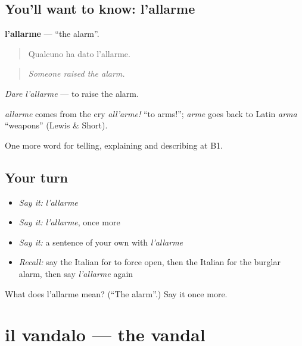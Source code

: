 \subsection*{You'll want to know: l'allarme}
\textbf{l'allarme} — \textquotedblleft{}the alarm\textquotedblright{}.

\begin{quote}
Qualcuno ha dato l'allarme.
\end{quote}

\begin{quote}
\emph{Someone raised the alarm.}
\end{quote}

\emph{Dare l'allarme} — to raise the alarm.

\begin{cousinweb}
\emph{allarme} comes from the cry \emph{all'arme!} \textquotedblleft{}to arms!\textquotedblright{}; \emph{arme} goes back to Latin \emph{arma} \textquotedblleft{}weapons\textquotedblright{} (Lewis \& Short).
\end{cousinweb}

\begin{grammarlens}[title={What you've built}]
One more word for telling, explaining and describing at B1.
\end{grammarlens}

\subsection*{Your turn}
\begin{itemize}
\raggedright
  \item \emph{Say it:} \emph{l'allarme}
  \item \emph{Say it:} \emph{l'allarme}, once more
  \item \emph{Say it:} a sentence of your own with \emph{l'allarme}
  \item \emph{Recall:} say the Italian for to force open, then the Italian for the burglar alarm, then say \emph{l'allarme} again
\end{itemize}

\begin{tcolorbox}[breakable,colback=teal!4,colframe=teal!35!black,title={Before you move on}]
What does l'allarme mean? (\textquotedblleft{}The alarm\textquotedblright{}.) Say it once more.
\end{tcolorbox}
\section[il vandalo]{il vandalo — the vandal}

